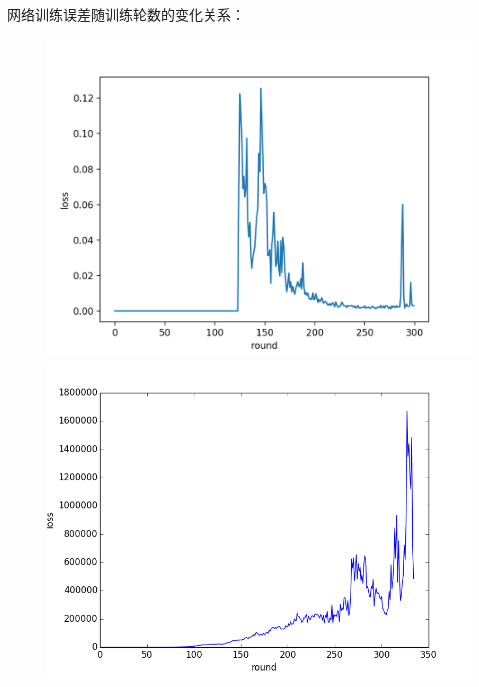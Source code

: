 \documentclass[a4paper,UTF8]{article}
\theoremstyle{definition}
\begin{document}
网络训练误差随训练轮数的变化关系：
\begin{figure}
	\centering                                                          %
	\begin{minipage}{7cm}\centering                                                          %
	\includegraphics[scale=0.5]{exper3_cartpole_loss.png}               %
	\end{minipage}
	\begin{minipage}{7cm}
		\centering                                                          %
		\includegraphics[scale=0.4]{exper3_mountaincar_loss.png}                %
	\end{minipage}


\end{figure}
\end{document}
